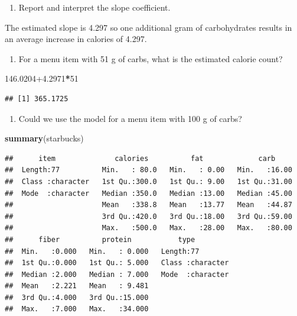 \documentclass[
]{book}
\newenvironment{Shaded}{\begin{snugshade}}{\end{snugshade}}
\newcommand{\DecValTok}[1]{\textcolor[rgb]{0.00,0.00,0.81}{#1}}
\newcommand{\FloatTok}[1]{\textcolor[rgb]{0.00,0.00,0.81}{#1}}
\newcommand{\KeywordTok}[1]{\textcolor[rgb]{0.13,0.29,0.53}{\textbf{#1}}}
\newcommand{\NormalTok}[1]{#1}
\newcommand{\OperatorTok}[1]{\textcolor[rgb]{0.81,0.36,0.00}{\textbf{#1}}}
\providecommand{\tightlist}{%
  \setlength{\itemsep}{0pt}\setlength{\parskip}{0pt}}
\begin{document}
\begin{enumerate}
\def\labelenumi{\alph{enumi}.}
\setcounter{enumi}{6}
\tightlist
\item
  Report and interpret the slope coefficient.
\end{enumerate}

The estimated slope is 4.297 so one additional gram of carbohydrates results in an average increase in calories of 4.297.

\begin{enumerate}
\def\labelenumi{\alph{enumi}.}
\setcounter{enumi}{7}
\tightlist
\item
  For a menu item with 51 g of carbs, what is the estimated calorie count?
\end{enumerate}

\begin{Shaded}
\begin{Highlighting}[]
\FloatTok{146.0204+4.2971}\OperatorTok{*}\DecValTok{51}
\end{Highlighting}
\end{Shaded}

\begin{verbatim}
## [1] 365.1725
\end{verbatim}

\begin{enumerate}
\def\labelenumi{\roman{enumi}.}
\tightlist
\item
  Could we use the model for a menu item with 100 g of carbs?
\end{enumerate}

\begin{Shaded}
\begin{Highlighting}[]
\KeywordTok{summary}\NormalTok{(starbucks)}
\end{Highlighting}
\end{Shaded}

\begin{verbatim}
##      item              calories          fat             carb      
##  Length:77          Min.   : 80.0   Min.   : 0.00   Min.   :16.00  
##  Class :character   1st Qu.:300.0   1st Qu.: 9.00   1st Qu.:31.00  
##  Mode  :character   Median :350.0   Median :13.00   Median :45.00  
##                     Mean   :338.8   Mean   :13.77   Mean   :44.87  
##                     3rd Qu.:420.0   3rd Qu.:18.00   3rd Qu.:59.00  
##                     Max.   :500.0   Max.   :28.00   Max.   :80.00  
##      fiber          protein           type          
##  Min.   :0.000   Min.   : 0.000   Length:77         
##  1st Qu.:0.000   1st Qu.: 5.000   Class :character  
##  Median :2.000   Median : 7.000   Mode  :character  
##  Mean   :2.221   Mean   : 9.481                     
##  3rd Qu.:4.000   3rd Qu.:15.000                     
##  Max.   :7.000   Max.   :34.000
\end{verbatim}
\end{document}
